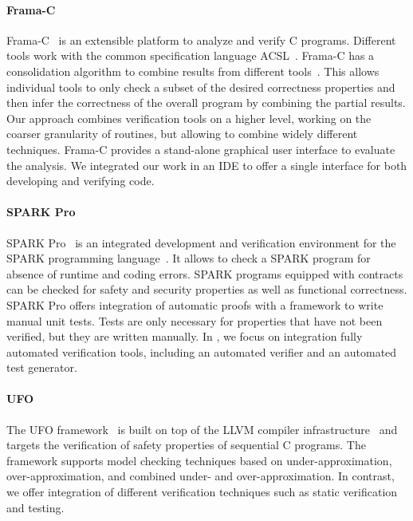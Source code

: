 \paragraph{Frama-C}

Frama-C~\cite{CUOQ12} is an extensible platform to analyze and verify C programs.
Different tools work with the common specification language ACSL~\cite{ACSL}.
Frama-C has a consolidation algorithm to combine results from different tools~\cite{CORRENSON12}.
This allows individual tools to only check a subset of the desired correctness properties and then infer the correctness of the overall program by combining the partial results.
Our approach combines verification tools on a higher level, working on the coarser granularity of routines, but allowing to combine widely different techniques.
Frama-C provides a stand-alone graphical user interface to evaluate the analysis.
We integrated our work in an IDE to offer a single interface for both developing and verifying code.

\paragraph{SPARK Pro}

SPARK Pro~\cite{SPARKPRO} is an integrated development and verification environment for the SPARK programming language~\cite{BARNES03}.
It allows to check a SPARK program for absence of runtime and coding errors.
SPARK programs equipped with contracts can be checked for safety and security properties as well as functional correctness.
SPARK Pro offers integration of automatic proofs with a framework to write manual unit tests. Tests are only necessary for properties that have not been verified, but they are written manually.
In \EVE, we focus on integration fully automated verification tools, including an automated verifier and an automated test generator.

\paragraph{UFO}

The UFO framework~\cite{ALBARGHOUTHI12b,ALBARGHOUTHI12c} is built on top of the LLVM compiler infrastructure~\cite{LATTNER04} and targets the verification of safety properties of sequential C programs.
The framework supports model checking techniques based on under-approximation, over-approximation, and combined under- and over-approximation.
In contrast, we offer integration of different verification techniques such as static verification and testing.


